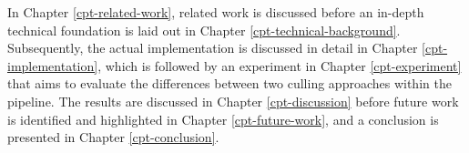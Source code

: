 \clearpage

\noindent
In Chapter \ref{cpt-related-work}, related work is discussed before an in-depth technical foundation 
is laid out in Chapter \ref{cpt-technical-background}. Subsequently, the actual implementation is discussed 
in detail in Chapter \ref{cpt-implementation}, which is followed by an experiment in Chapter \ref{cpt-experiment} 
that aims to evaluate the differences between two culling approaches within the pipeline. The results are 
discussed in Chapter \ref{cpt-discussion} before future work is identified and highlighted in Chapter 
\ref{cpt-future-work}, and a conclusion is presented in Chapter \ref{cpt-conclusion}. 
